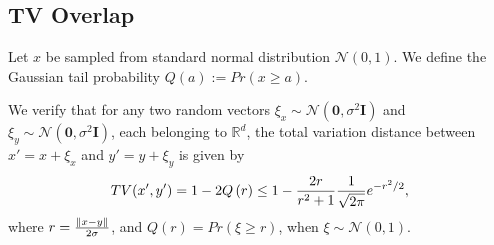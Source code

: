 \subsection{TV Overlap}

\begin{definition}
\label{d:Q}
Let $x$ be sampled from standard normal distribution $\mathcal{N}(0,1)$. We define the Gaussian tail probability $Q(a):= Pr(x\geq a)$. 
\end{definition}

\begin{lemma}
\label{l:gaussian_tv_coupling}
We verify that for any two random vectors $\xi_x\sim \mathcal{N}(\bm{0},\sigma^2 \bm{I})$ and $\xi_y \sim \mathcal{N}(\bm{0},\sigma^2 \bm{I})$, each belonging to $\mathbb{R}^d$, the total variation distance between $x' = x + \xi_x$ and $y' = y + \xi_y$ is given by
\begin{align*}
    TV(x',y') = 1- 2 Q\left( r \right) \leq 1- \frac{2r}{r^2 + 1} \frac{1}{\sqrt{2\pi}} e^{- r^2 / 2},
\end{align*}
where $r=\frac{\left\| x-y \right\|}{2\sigma}$, and $Q(r) = Pr(\xi \geq r)$, when $\xi \sim \mathcal{N}(0,1)$. 
\end{lemma}

